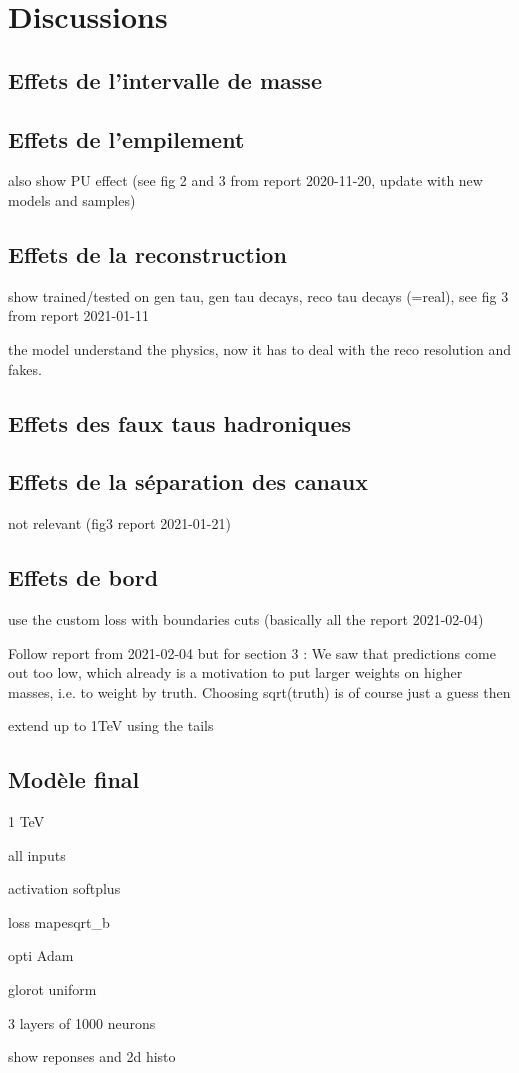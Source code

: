 \section{Discussions}\label{chapter-ML-section-discussion}

\subsection{Effets de l'intervalle de masse}

\subsection{Effets de l'empilement}
also show PU effect (see fig 2 and 3 from report 2020-11-20, update with new models and samples)

\subsection{Effets de la reconstruction}
show trained/tested on gen tau, gen tau decays, reco tau decays (=real), see fig 3 from report 2021-01-11

the model understand the physics, now it has to deal with the reco resolution and fakes.

\subsection{Effets des faux taus hadroniques}

\subsection{Effets de la séparation des canaux}
not relevant (fig3 report  2021-01-21)

\subsection{Effets de bord}
use the custom loss with boundaries cuts (basically all the report 2021-02-04)

Follow report from 2021-02-04 but for section 3 : We saw that predictions come out too low, which already is a motivation to put larger weights on higher masses, i.e. to weight by truth. Choosing sqrt(truth) is of course just a guess then

extend up to 1TeV using the tails


\subsection{Modèle final}

\DEEPTAU

1 TeV

all inputs

activation softplus

loss mapesqrt\_b

opti Adam

glorot uniform

3 layers of 1000 neurons

show reponses and 2d histo
